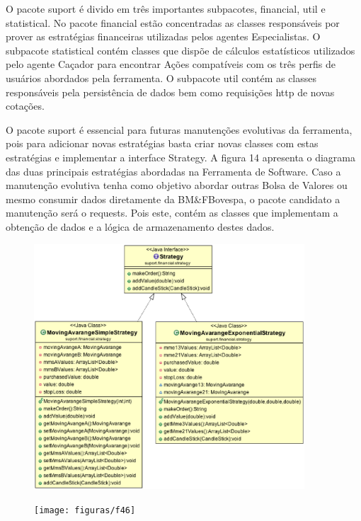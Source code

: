 \begin{apendicesenv}
O pacote suport é divido em três importantes subpacotes, financial, util e statistical. No pacote financial estão concentradas as classes responsáveis por prover as estratégias financeiras utilizadas pelos agentes Especialistas. O subpacote statistical contém classes que dispõe de cálculos estatísticos utilizados pelo agente Caçador para encontrar Ações compatíveis com os três perfis de usuários abordados pela ferramenta. O subpacote util contém as classes responsáveis pela persistência de dados bem como requisições http de novas cotações.

O pacote suport é essencial para futuras manutenções evolutivas da ferramenta, pois para adicionar novas estratégias basta criar novas classes com estas estratégias e implementar a interface Strategy. A figura 14 apresenta o diagrama das duas principais estratégias abordadas na Ferramenta de Software. Caso a manutenção evolutiva tenha como objetivo abordar outras Bolsa de Valores ou mesmo consumir dados diretamente da BM\&FBovespa, o pacote candidato a manutenção será o requests. Pois este, contém as classes que implementam a obtenção de dados e a lógica de armazenamento destes dados.

\begin{figure}[h]
\centering
\label{f14}
\includegraphics[width=0.9\textwidth]{figuras/estrategiasClasses}
\end{figure}

\begin{figure}[h]
\centering
\label{f15}
\texttt{[image: figuras/f46]}
\end{figure}


\end{apendicesenv}
